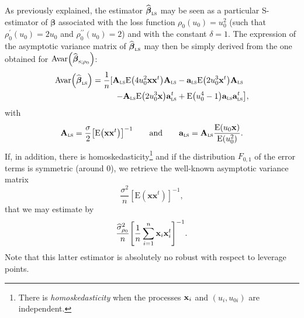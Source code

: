 \begin{stremark}
As previously explained, the  estimator $\sthat{\boldsymbol\beta%
}_{\stsc{LS}}$ may be seen as a particular S-estimator of $\boldsymbol{\beta
}$ associated with the loss function $\rho_{0}\left(  u_{0}\right)  =u_{0}%
^{2}$ (such that $\rho_{0}^{\prime}\left(  u_{0}\right)  =2u_{0}$ and
$\rho_{0}^{\prime\prime}\left(  u_{0}\right)  =2$) and with the constant
$\delta=1$. The expression of the asymptotic variance matrix of $\widehat
{\boldsymbol\beta}_{\stsc{LS}}$ may then be simply derived from the one
obtained for $\mathrm{Avar}\left(  \sthat{\boldsymbol\beta}_{\stsc{S}%
;\rho_{0}}\right)  $:%
\begin{align}
\mathrm{Avar}\left(  \sthat{\boldsymbol\beta}_{\stsc{LS}}\right)   &
=\frac{1}{n}[\mathbf{A}_{\stsc{LS}}\mathrm{E}\left(  4u_{0}^{2}%
\mathbf{xx}^{t}\right)  \mathbf{A}_{\stsc{LS}}-\mathbf{a}_{\stsc{LS}%
}\mathrm{E}\left(  2u_{0}^{3}\stvec{x}^{t}\right)  \mathbf{A}_{\stsc{LS}%
}\label{eq:Avar_betahat_LS}\\
&  \hspace*{1cm}\left.  -\mathbf{A}_{\stsc{LS}}\mathrm{E}\left(  2u_{0}%
^{3}\stvec{x}\right)  \mathbf{a}_{\stsc{LS}}^{t}+\mathrm{E}\left(
u_{0}^{4}-1\right)  \mathbf{a}_{\stsc{LS}}\mathbf{a}_{\stsc{LS}}%
^{t}\right]  ,\nonumber
\end{align}
with%
\begin{equation}
\mathbf{A}_{\stsc{LS}}=\frac{\sigma}{2}\left[  \mathrm{E}\left(
\mathbf{xx}^{t}\right)  \right]  ^{-1}\qquad\text{and}\qquad\mathbf{a}%
_{\stsc{LS}}=\mathbf{A}_{\stsc{LS}}\frac{\mathrm{E}\left(  u_{0}%
\stvec{x}\right)  }{\mathrm{E}\left(  u_{0}^{2}\right)  }. \label{eq:A_a_LS}%
\end{equation}
If, in addition, there is homoskedasticity\footnote{There is
\emph{homoskedasticity} when the processes $\mathbf x_{i}$ and $\left(
u_{i},u_{0i}\right)  $ are independent.} and if the distribution $F_{0,1}$ of
the error terms is symmetric (around 0), we retrieve the well-known asymptotic
variance matrix
\[
\frac{\sigma^{2}}{n}\left[  \mathrm{E}\left(  \mathbf{xx}^{t}\right)  \right]
^{-1},
\]
that we may estimate by
\[
\frac{\sthat{\sigma}_{\rho_{0}}^{2}}{n}\left[  \frac{1}{n}\sum_{i=1}%
^{n}\stvec{x}_{i}\stvec{x}_{i}^{t}\right]  ^{-1}.
\]
Note that this latter estimator is absolutely no robust with respect to
leverage points.


\end{stremark}
